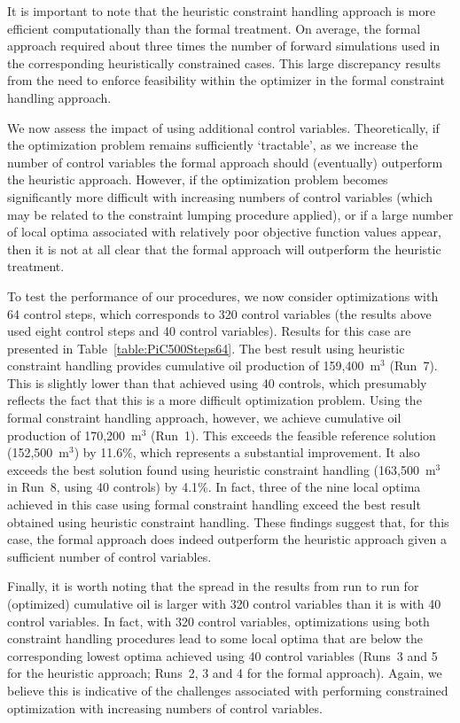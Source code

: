 \documentclass[twocolumn,numbook]{svjour3}          %
\begin{document}
It is important to note that the heuristic constraint handling approach is
more efficient computationally than the formal treatment. On average,
the formal approach required about three times the number of forward
simulations used in the corresponding heuristically constrained cases. This
large discrepancy results from the need to enforce feasibility within the
optimizer in the formal constraint handling approach.

We now assess the impact of using additional control variables. Theoretically, if the optimization problem remains sufficiently `tractable', as we increase the number of control variables the formal approach should (eventually) outperform the heuristic approach. However, if the optimization problem becomes significantly more difficult with increasing numbers of control variables (which may be related to the constraint lumping procedure applied), or if a large number of local optima associated with relatively poor objective function values appear, then it is not at all clear that the formal approach will outperform the heuristic treatment. 

To test the performance of our procedures, we now consider optimizations with 64 control steps, which corresponds to 320 control variables (the results above used eight control steps and 40 control variables). Results for this case are presented in Table~\ref{table:PiC500Steps64}. The best result using heuristic constraint handling provides cumulative oil production of 159,400~m$^3$ (Run~7). This is slightly lower than that achieved using 40 controls, which presumably reflects the fact that this is a more difficult optimization problem. Using the formal constraint handling approach, however, we achieve cumulative oil production of 170,200~m$^3$ (Run~1). This exceeds the feasible reference solution (152,500~m$^3$) by 11.6\%, which represents a substantial improvement. It also exceeds the best solution found using heuristic constraint handling (163,500~m$^3$ in Run~8, using 40 controls) by 4.1\%. In fact, three of the nine local optima achieved in this case using formal constraint handling exceed the best result obtained using heuristic constraint handling. These findings suggest that, for this case, the formal approach does indeed outperform the heuristic approach given a sufficient number of control variables.

Finally, it is worth noting that the spread in the results from run to run for (optimized) cumulative oil is larger with 320 control variables than it is with 40 control variables. In fact, with 320 control variables, optimizations using both constraint handling procedures lead to some local optima that are below the corresponding lowest optima achieved using 40 control variables (Runs~3 and 5 for the heuristic approach; Runs~2, 3 and 4 for the formal approach). Again, we believe this is indicative of the challenges associated with performing constrained optimization with increasing numbers of control variables.
\end{document}
